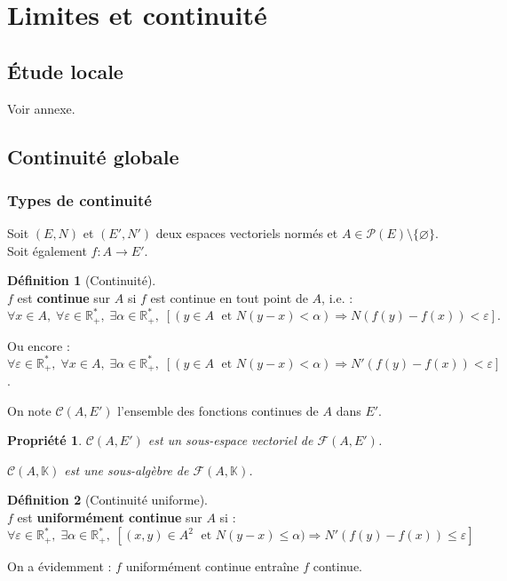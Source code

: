 \documentclass[12pt]{book}
\let\ensembleNombre\mathbb
\newcommand*\R{\ensuremath{\ensembleNombre{R}}}
\newcommand*\K{\ensuremath{\ensembleNombre{K}}}
\newtheorem*{prop}{Propriété}
\theoremstyle{definition}
\newtheorem*{defi}{Définition}
\theoremstyle{remark}
\newenvironment{fdef}
  {\begin{mdframed}[roundcorner=10pt, linewidth=1pt]\begin{defi}}
  {\end{defi}\end{mdframed}}
\begin{document}
	\section{Limites et continuité}
		\subsection{Étude locale}
	Voir annexe.
		\subsection{Continuité globale}
			\subsubsection{Types de continuité}
	Soit $(E,N)$ et $(E', N')$ deux espaces vectoriels normés et $A \in \mathcal P(E) \setminus \lbrace \varnothing \rbrace$. Soit également $f : A \longrightarrow E'$.
	\begin{fdef}[Continuité]\mbox{~}\\
	$f$ est \textbf{continue} sur $A$ si $f$ est continue en tout point de $A$, i.e. : 
	\[ \forall x \in A,\; \forall \varepsilon \in \R_+^*,\; \exists \alpha \in \R_+^*, \; [(y\in A \;\text{ et } N(y-x) < \alpha) \Longrightarrow N(f(y) - f(x)) < \varepsilon]. \]
	
	\noindent Ou encore : $\forall \varepsilon \in \R_+^*,\; \forall x \in A,\; \exists \alpha \in \R_+^*, \; [(y\in A \;\text{ et } N(y-x) < \alpha) \Longrightarrow N'(f(y) - f(x)) < \varepsilon]$.
	\end{fdef}
	
	On note $\mathcal C(A,E')$ l'ensemble des fonctions continues de $A$ dans $E'$.
	\begin{prop}
	$\mathcal C(A,E')$ est un sous-espace vectoriel de $\mathcal F(A, E')$.
	
	$\mathcal C(A,\K)$ est une sous-algèbre de $\mathcal F(A, \K)$.
	\end{prop}
	
	\begin{fdef}[Continuité uniforme]\mbox{~}\\
	$f$ est \textbf{uniformément continue} sur $A$ si :
	\[ \forall \varepsilon \in \R_+^*,\; \exists \alpha \in \R_+^*, \; [(x,y) \in A^2 \; \text{ et } N(y-x) \leq \alpha) \Longrightarrow N'(f(y) - f(x)) \leq \varepsilon] \]
	\end{fdef}
	
	On a évidemment : $f$ uniformément continue entraîne $f$ continue.
	
\end{document}
